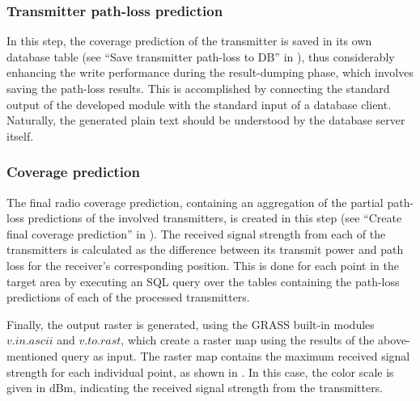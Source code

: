 \subsubsection{Transmitter path-loss prediction\label{sub:Transmitter-path-loss-prediction}}

In this step, the coverage prediction of the transmitter is saved
in its own database table (see ``Save transmitter path-loss to DB''
in ), thus considerably
enhancing the write performance during the result-dumping phase, which
involves saving the path-loss results. This is accomplished by connecting
the standard output of the developed module with the standard input
of a database client. Naturally, the generated plain text should be
understood by the database server itself.


\subsubsection{Coverage prediction\label{sub:Final-coverage-prediction}}

The final radio coverage prediction, containing an aggregation of
the partial path-loss predictions of the involved transmitters, is
created in this step (see ``Create final coverage prediction'' in
). The received signal
strength from each of the transmitters is calculated as the difference
between its transmit power and path loss for the receiver's corresponding
position. This is done for each point in the target area by executing
an SQL query over the tables containing the path-loss predictions
of each of the processed transmitters.

Finally, the output raster is generated, using the GRASS built-in
modules $v.in.ascii$ and $v.to.rast$, which create a raster map
using the results of the above-mentioned query as input. The raster
map contains the maximum received signal strength for each individual
point, as shown in . In this
case, the color scale is given in dBm, indicating the received signal
strength from the transmitters.

